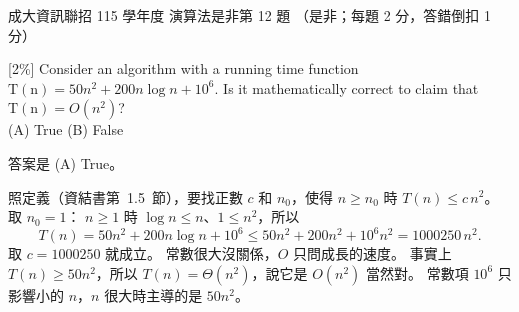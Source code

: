 \begin{pastexam}[label={px:ncku-115-prog-09}]{成大資訊聯招 115 學年度 演算法是非第 12 題}
（是非；每題 2 分，答錯倒扣 1 分）

[2\%] Consider an algorithm with a running time function $\mathrm{T(n)} = 50n^2 + 200n\log n + 10^6$.
Is it mathematically correct to claim that $\mathrm{T(n)} = O(n^2)$?\\
(A) True \qquad (B) False
\end{pastexam}

\begin{pastsoln}
答案是 (A) True。

照定義（資結書第~1.5~節），要找正數 $c$ 和 $n_0$，使得 $n \ge n_0$ 時 $T(n) \le c\,n^2$。 取 $n_0 = 1$：
$n \ge 1$ 時 $\log n \le n$、$1 \le n^2$，所以
\[
T(n) = 50n^2 + 200 n \log n + 10^6 \le 50n^2 + 200 n^2 + 10^6 n^2 = 1000250\, n^2 .
\]
取 $c = 1000250$ 就成立。 常數很大沒關係，$O$ 只問成長的速度。 事實上 $T(n) \ge 50 n^2$，所以
$T(n) = \Theta(n^2)$，說它是 $O(n^2)$ 當然對。 常數項 $10^6$ 只影響小的 $n$，$n$ 很大時主導的是 $50n^2$。
\end{pastsoln}
